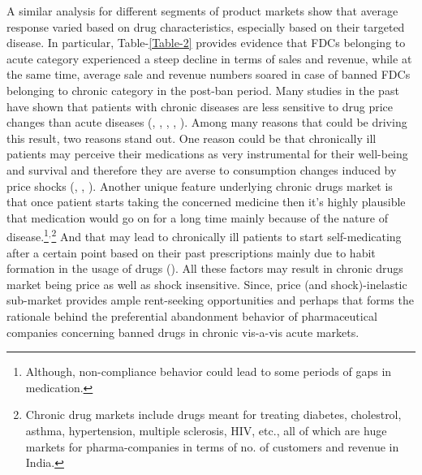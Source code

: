 \documentclass[AER]{AEA}
\theoremstyle{theorem}
\begin{document}
A similar analysis for different segments of product markets show that average response varied based on drug characteristics, especially based on their targeted disease. In particular, Table-\ref{Table-2} provides evidence that FDCs belonging to acute category experienced a steep decline in terms of sales and revenue, while at the same time, average sale and revenue numbers soared in case of banned FDCs belonging to chronic category in the post-ban period. Many studies in the past have shown that patients with chronic diseases are less sensitive to drug price changes than acute diseases (\cite{jimenez2016consumo}, \cite{tur2012estimates}, \cite{hernandez2019effect}, \cite{grootendorst2002drug}, \cite{contoyannis2005estimating}). Among many reasons that could be driving this result, two reasons stand out. One reason could be that chronically ill patients may perceive their medications as very instrumental for their well-being and survival and therefore they are averse to consumption changes induced by price shocks (\cite{andersson2006policy}, \cite{blais2001impact}, \cite{pilote2002effects}). Another unique feature underlying chronic drugs market is that once patient starts taking the concerned medicine then it's highly plausible that medication would go on for a long time mainly because of the nature of disease.\footnote{Although, non-compliance behavior could lead to some periods of gaps in medication.}$^{,}$\footnote{Chronic drug markets include drugs meant for treating diabetes, cholestrol, asthma, hypertension, multiple sclerosis, HIV, etc., all of which are huge markets for pharma-companies in terms of no. of customers and revenue in India.} And that may lead to chronically ill patients to start self-medicating after a certain point based on their past prescriptions mainly due to habit formation in the usage of drugs (\cite{varpaei2020}). All these factors may result in chronic drugs market being price as well as shock insensitive. Since, price (and shock)-inelastic sub-market provides ample rent-seeking opportunities and perhaps that forms the rationale behind the preferential abandonment behavior of pharmaceutical companies concerning banned drugs in chronic vis-a-vis acute markets.
\end{document}

